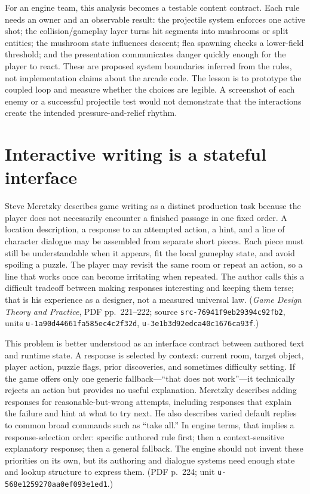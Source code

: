 For an engine team, this analysis becomes a testable content contract. Each rule needs an owner and an observable result: the projectile system enforces one active shot; the collision/gameplay layer turns hit segments into mushrooms or split entities; the mushroom state influences descent; flea spawning checks a lower-field threshold; and the presentation communicates danger quickly enough for the player to react. These are proposed system boundaries inferred from the rules, not implementation claims about the arcade code. The lesson is to prototype the coupled loop and measure whether the choices are legible. A screenshot of each enemy or a successful projectile test would not demonstrate that the interactions create the intended pressure-and-relief rhythm.

\section{Interactive writing is a stateful interface}\label{06-engine-ii-ch046-interactive-writing-is-a-stateful-interface}

\hypertarget{06-engine-ii-ch046-interactive-writing-is-a-stateful-interface}{}

Steve Meretzky describes game writing as a distinct production task because the player does not necessarily encounter a finished passage in one fixed order. A location description, a response to an attempted action, a hint, and a line of character dialogue may be assembled from separate short pieces. Each piece must still be understandable when it appears, fit the local gameplay state, and avoid spoiling a puzzle. The player may revisit the same room or repeat an action, so a line that works once can become irritating when repeated. The author calls this a difficult tradeoff between making responses interesting and keeping them terse; that is his experience as a designer, not a measured universal law. (\emph{Game Design Theory and Practice}, PDF pp.~221--222; source \texttt{src-76941f9eb29394c92fb2}, units \texttt{u-1a90d44661fa585ec4c2f32d}, \texttt{u-3e1b3d92edca40c1676ca93f}.)

This problem is better understood as an interface contract between authored text and runtime state. A response is selected by context: current room, target object, player action, puzzle flags, prior discoveries, and sometimes difficulty setting. If the game offers only one generic fallback---``that does not work''---it technically rejects an action but provides no useful explanation. Meretzky describes adding responses for reasonable-but-wrong attempts, including responses that explain the failure and hint at what to try next. He also describes varied default replies to common broad commands such as ``take all.'' In engine terms, that implies a response-selection order: specific authored rule first; then a context-sensitive explanatory response; then a general fallback. The engine should not invent these priorities on its own, but its authoring and dialogue systems need enough state and lookup structure to express them. (PDF p.~224; unit \texttt{u-568e1259270aa0ef093e1ed1}.)


